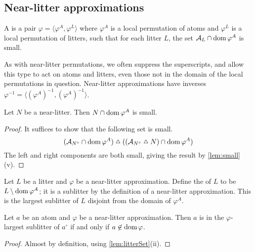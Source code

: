 \subsection{Near-litter approximations}

\begin{definition}
    A  is a pair \( \varphi = \langle \varphi^A, \varphi^L \rangle \) where \( \varphi^A \) is a local permutation of atoms and \( \varphi^L \) is a local permutation of litters, such that for each litter \( L \), the set \( \mathcal A_L \cap \operatorname{dom} \varphi^A \) is small.
\end{definition}
As with near-litter permutations, we often suppress the superscripts, and allow this type to act on atoms and litters, even those not in the domain of the local permutations in question.
Near-litter approximations have inverses \( \varphi^{-1} = \langle (\varphi^A)^{-1}, (\varphi^A)^{-1} \rangle \).
\begin{lemma}
    \label{lem:nearLitter_domain_small}
    Let \( N \) be a near-litter.
    Then \( N \cap \operatorname{dom} \varphi^A \) is small.
\end{lemma}
\begin{proof}
    It suffices to show that the following set is small.
    \[ (\mathcal A_{N^\circ} \cap \dom \varphi^A) \symmdiff ((\mathcal A_{N^\circ} \symmdiff N) \cap \dom \varphi^A) \]
    The left and right components are both small, giving the result by \cref{lem:small}(v).
\end{proof}
\begin{definition}
    Let \( L \) be a litter and \( \varphi \) be a near-litter approximation.
    Define the  of \( L \) to be \( L \setminus \operatorname{dom} \varphi^A \); it is a sublitter by the definition of a near-litter approximation.
    This is the largest sublitter of \( L \) disjoint from the domain of \( \varphi^A \).
\end{definition}
\begin{lemma}
    Let \( a \) be an atom and \( \varphi \) be a near-litter approximation.
    Then \( a \) is in the \( \varphi \)-largest sublitter of \( a^\circ \) if and only if \( a \not\in \operatorname{dom} \varphi \).
\end{lemma}
\begin{proof}
    Almost by definition, using \cref{lem:litterSet}(ii).
\end{proof}
